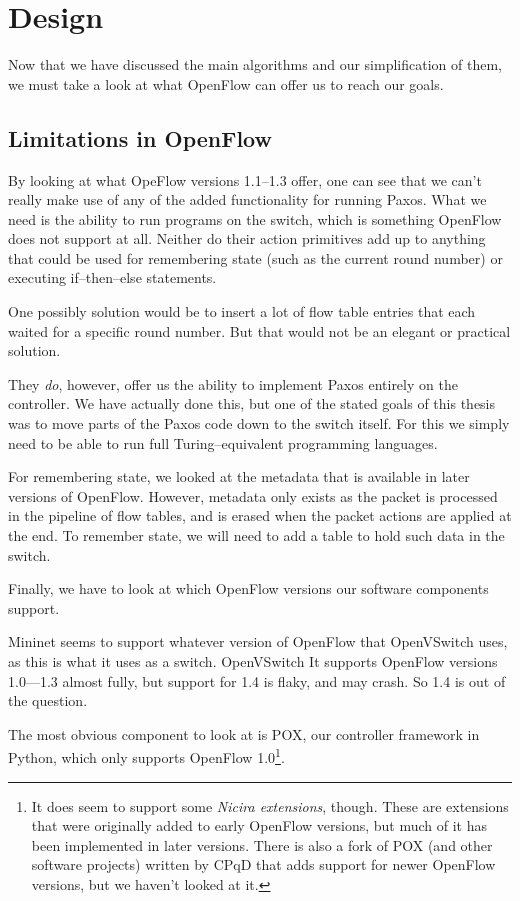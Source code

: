 \chapter{Design}
\label{chapter:design}

Now that we have discussed the main algorithms and our simplification of
them, we must take a look at what OpenFlow can offer us to reach our goals.



\section{Limitations in OpenFlow}

By looking at what OpeFlow versions 1.1--1.3 offer, one can see that we can't really
make use of any of the added functionality for running Paxos.  What we need
is the ability to run programs on the switch, which is something OpenFlow
does not support at all.  Neither do their action primitives add up to
anything that could be used for remembering state (such as the current round
number) or executing if--then--else statements.

One possibly solution would be to insert a lot of flow table entries that
each waited for a specific round number.  But that would not be an elegant
or practical solution.

They \textit{do}, however, offer us the ability to implement Paxos entirely
on the controller.  We have actually done this, but one of the stated goals
of this thesis was to move parts of the Paxos code down to the switch
itself.  For this we simply need to be able to run full Turing--equivalent
programming languages.

For remembering state, we looked at the metadata that is available in later
versions of OpenFlow.  However, metadata only exists as the packet is
processed in the pipeline of flow tables, and is erased when the packet
actions are applied at the end.  To remember state, we will need to add a
table to hold such data in the switch.

Finally, we have to look at which OpenFlow versions our software components
support.

Mininet seems to support whatever version of OpenFlow that OpenVSwitch uses,
as this is what it uses as a switch.  OpenVSwitch It supports OpenFlow versions
1.0---1.3 almost fully, but support for 1.4 is flaky, and may crash.  So 1.4
is out of the question.

The most obvious component to look at is POX, our controller
framework in Python, which only supports OpenFlow 1.0\footnote{It does seem
to support some \textit{Nicira extensions}, though.  These are extensions
that were originally added to early OpenFlow versions, but much of it
has been implemented in later versions.  There is also a fork of POX (and other
software projects) written by CPqD that adds support for newer OpenFlow
versions, but we haven't looked at it.}.


